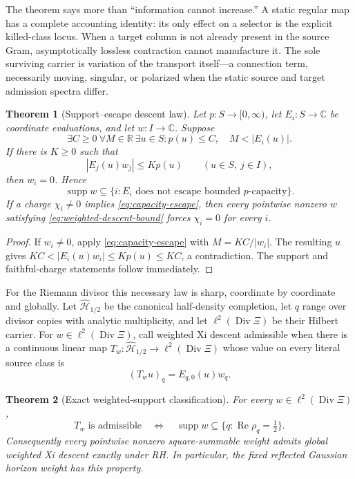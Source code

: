 \documentclass[11pt]{article}
\newtheorem{theorem}{Theorem}[section]
\theoremstyle{definition}
\theoremstyle{remark}
\newcommand{\C}{\mathbb C}
\newcommand{\R}{\mathbb R}
\newcommand{\cH}{\mathcal H}
\newcommand{\Rea}{\operatorname{Re}}
\newcommand{\Div}{\operatorname{Div}}
\begin{document}
The theorem says more than ``information cannot increase.''  A static
regular map has a complete accounting identity: its only effect on a
selector is the explicit killed-class locus.  When a target column is not
already present in the source Gram, asymptotically lossless contraction
cannot manufacture it.  The sole surviving carrier is variation of the
transport itself---a connection term, necessarily moving, singular, or
polarized when the static source and target admission spectra differ.

\begin{theorem}[Support--escape descent law]
\label{thm:support-escape}
Let \(p:S\to[0,\infty)\), let \(E_i:S\to\C\) be coordinate evaluations,
and let \(w:I\to\C\).  Suppose
\[
 \exists C\ge0\ \forall M\in\R\ \exists u\in S:
 p(u)\le C,\quad M<|E_i(u)|.
\tag{4.17a}\label{eq:capacity-escape}
\]
If there is \(K\ge0\) such that
\[
                    |E_j(u)w_j|\le Kp(u)
       \qquad(u\in S,\ j\in I),
\tag{4.17b}\label{eq:weighted-descent-bound}
\]
then \(w_i=0\).  Hence
\[
 \operatorname{supp}w\subseteq
 \{i:E_i\text{ does not escape bounded }p\text{-capacity}\}.
\tag{4.17c}\label{eq:support-nonescape}
\]
If a charge \(\chi_i\ne0\) implies \eqref{eq:capacity-escape}, then every
pointwise nonzero \(w\) satisfying \eqref{eq:weighted-descent-bound} forces
\(\chi_i=0\) for every \(i\).
\end{theorem}

\begin{proof}
If \(w_i\ne0\), apply \eqref{eq:capacity-escape} with
\(M=KC/|w_i|\).  The resulting \(u\) gives
\(KC<|E_i(u)w_i|\le Kp(u)\le KC\), a contradiction.  The support and
faithful-charge statements follow immediately.
\end{proof}

For the Riemann divisor this necessary law is sharp, coordinate by
coordinate and globally.  Let \(\widehat{\cH}_{1/2}\) be the canonical
half-density completion, let \(q\) range over divisor copies with analytic
multiplicity, and let \(\ell^2(\Div\Xi)\) be their Hilbert carrier.  For
\(w\in\ell^2(\Div\Xi)\), call weighted Xi descent admissible when there is a
continuous linear map \(T_w:\widehat{\cH}_{1/2}\to\ell^2(\Div\Xi)\) whose
value on every literal source class is
\[
                         (T_wu)_q=E_{q,0}(u)w_q.
\tag{4.17d}\label{eq:weighted-xi-descent}
\]

\begin{theorem}[Exact weighted-support classification]
\label{thm:weighted-support-classification}
For every \(w\in\ell^2(\Div\Xi)\),
\[
 T_w\text{ is admissible}
 \quad\Longleftrightarrow\quad
 \operatorname{supp}w\subseteq
 \{q:\Rea\rho_q=\tfrac12\}.
\tag{4.17e}\label{eq:weighted-support-classification}
\]
Consequently every pointwise nonzero square-summable weight admits global
weighted Xi descent exactly under RH.  In particular, the fixed reflected
Gaussian horizon weight has this property.
\end{theorem}
\end{document}
